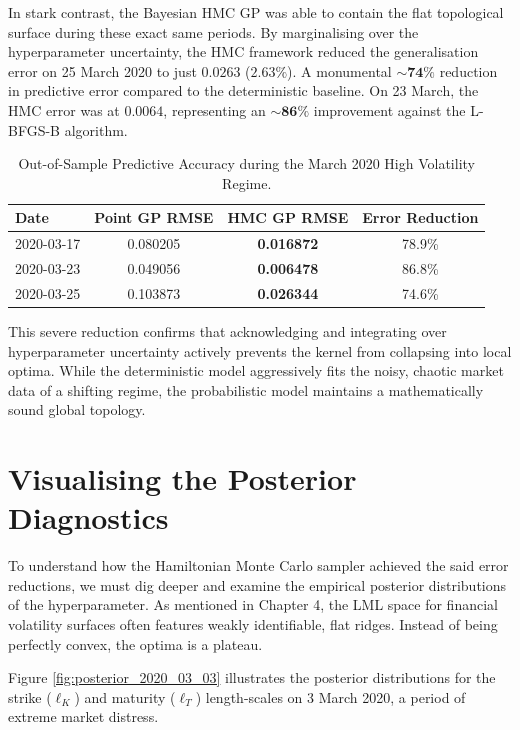 \documentclass[12pt,oneside]{report}
\theoremstyle{definition}
\theoremstyle{remark}
\begin{document}
In stark contrast, the Bayesian HMC GP was able to contain the flat topological surface during these exact same periods. By marginalising over the hyperparameter uncertainty, the HMC framework reduced the generalisation error on 25 March 2020 to just $0.0263$ ($2.63\%$). A monumental $\mathbf{\sim74\%}$ reduction in predictive error compared to the deterministic baseline. On 23 March, the HMC error was at $0.0064$, representing an $\mathbf{\sim86\%}$ improvement against the L-BFGS-B algorithm.

\begin{table}[htbp]
\centering
\begin{tabular}{lccc}
\toprule
\textbf{Date} & \textbf{Point GP RMSE} & \textbf{HMC GP RMSE} & \textbf{Error Reduction} \\\midrule
2020-03-17 & 0.080205 & \textbf{0.016872} & 78.9\% \\
2020-03-23 & 0.049056 & \textbf{0.006478} & 86.8\% \\
2020-03-25 & 0.103873 & \textbf{0.026344} & 74.6\% \\
\bottomrule
\end{tabular}
\caption{Out-of-Sample Predictive Accuracy during the March 2020 High Volatility Regime.}\label{tab:rmse_comparison_2020}
\end{table}

This severe reduction confirms that acknowledging and integrating over hyperparameter uncertainty actively prevents the kernel from collapsing into local optima. While the deterministic model aggressively fits the noisy, chaotic market data of a shifting regime, the probabilistic model maintains a mathematically sound global topology.

\section{Visualising the Posterior Diagnostics}
To understand how the Hamiltonian Monte Carlo sampler achieved the said error reductions, we must dig deeper and examine the empirical posterior distributions of the hyperparameter. As mentioned in Chapter 4, the LML space for financial volatility surfaces often features weakly identifiable, flat ridges. Instead of being perfectly convex, the optima is a plateau.

Figure \ref{fig:posterior_2020_03_03} illustrates the posterior distributions for the strike ($\ell_K$) and maturity ($\ell_T$) length-scales on 3 March 2020, a period of extreme market distress.
\end{document}
